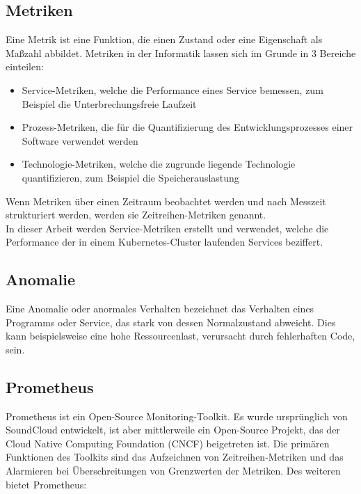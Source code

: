 \documentclass[a4paper,10pt]{scrartcl}
\begin{document}
\subsection{Metriken}
Eine Metrik ist eine Funktion, die einen Zustand oder eine Eigenschaft als Maßzahl
abbildet. Metriken in der Informatik lassen sich im Grunde in 3 Bereiche einteilen:
\begin{itemize}
\item Service-Metriken, welche die Performance eines Service bemessen, zum Beispiel die
Unterbrechungsfreie Laufzeit
\item Prozess-Metriken, die für die Quantifizierung des Entwicklungsprozesses einer Software verwendet werden
\item Technologie-Metriken, welche die zugrunde liegende Technologie quantifizieren, zum
Beispiel die Speicherauslastung
\end{itemize}

Wenn Metriken über einen Zeitraum beobachtet werden und nach Messzeit strukturiert werden, werden sie Zeitreihen-Metriken genannt.\\
In dieser Arbeit werden Service-Metriken erstellt und verwendet, welche die Performance der in einem Kubernetes-Cluster laufenden Services beziffert.


\subsection{Anomalie}

Eine Anomalie oder anormales Verhalten bezeichnet das Verhalten eines Programms oder Service, das stark von dessen Normalzustand abweicht. Dies kann beispielsweise eine hohe Ressourcenlast, verursacht durch fehlerhaften Code, sein. \cite{.19.07.2020d}

\subsection{Prometheus}
Prometheus ist ein Open-Source Monitoring-Toolkit. Es wurde ursprünglich von SoundCloud entwickelt, ist aber mittlerweile ein Open-Source Projekt, das der Cloud Native
Computing Foundation (CNCF) beigetreten ist. Die primären Funktionen des Toolkits
sind das Aufzeichnen von Zeitreihen-Metriken und das Alarmieren bei Überschreitungen
von Grenzwerten der Metriken. Des weiteren bietet Prometheus:\\
\end{document}
